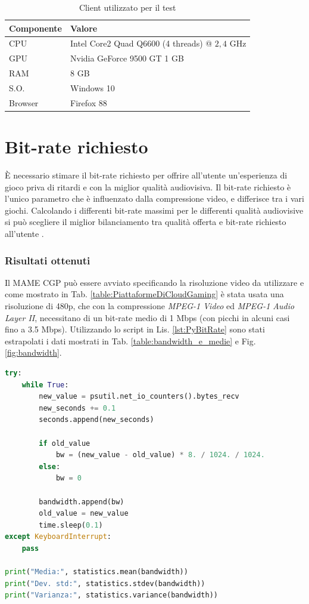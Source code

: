 \begin{table}[H]
	\centering
	\begin{tabular}{||l l||}
		\hline
		Componente & Valore \\
		\hline\hline				
		\hline
		CPU & Intel Core2 Quad Q6600 (4 threads) @ $2,4$ GHz \\
		\hline
		GPU & Nvidia GeForce 9500 GT 1 GB\\
		\hline
		RAM & 8 GB \\		
		\hline
		S.O. & Windows 10 \\
		\hline
		Browser & Firefox 88 \\
		\hline
	\end{tabular}

	\caption{Client utilizzato per il test}
	\label{table:ClientUsato}
\end{table}




\section{Bit-rate richiesto}
È necessario stimare il bit-rate richiesto per offrire all'utente un'esperienza di gioco priva di ritardi e con la miglior qualità audiovisiva. Il bit-rate richiesto è l'unico parametro che è influenzato dalla compressione video, e differisce tra i vari giochi. Calcolando i differenti bit-rate massimi per le differenti qualità audiovisive si può scegliere il miglior bilanciamento tra qualità offerta e bit-rate richiesto all'utente \parencite{ChenKuanTa2014OtQo}.

\subsubsection{Risultati ottenuti}
Il MAME CGP può essere avviato specificando la risoluzione video da utilizzare e come mostrato in Tab. \ref{table:PiattaformeDiCloudGaming} è stata usata una risoluzione di 480p, che con la compressione \textit{MPEG-1 Video} ed \textit{MPEG-1 Audio Layer II}, necessitano di un bit-rate medio di 1 Mbps (con picchi in alcuni casi fino a 3.5 Mbps). Utilizzando lo script in Lis. \ref{lst:PyBitRate} sono stati estrapolati i dati mostrati in Tab. \ref{table:bandwidth_e_medie} e Fig. \ref{fig:bandwidth}.

\begin{lstlisting}[language=Python, caption=Script Python per il calcolo del bit-rate richiesto, label={lst:PyBitRate}]
try:
	while True:
		new_value = psutil.net_io_counters().bytes_recv
		new_seconds += 0.1
		seconds.append(new_seconds)

		if old_value
			bw = (new_value - old_value) * 8. / 1024. / 1024.
		else:
			bw = 0

		bandwidth.append(bw)
		old_value = new_value
		time.sleep(0.1)
except KeyboardInterrupt:
	pass

print("Media:", statistics.mean(bandwidth))
print("Dev. std:", statistics.stdev(bandwidth))
print("Varianza:", statistics.variance(bandwidth))
\end{lstlisting}

